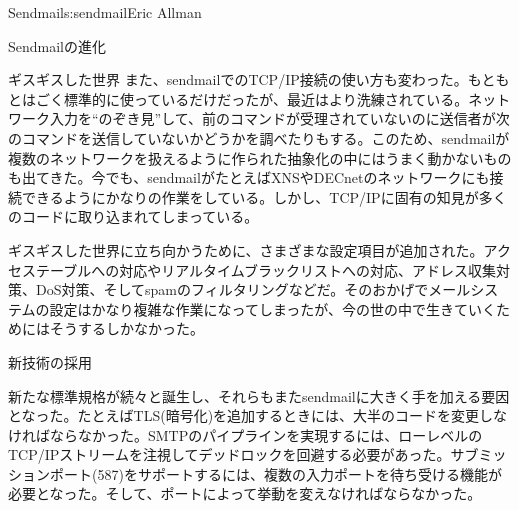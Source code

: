 \begin{aosachapter}{Sendmail}{s:sendmail}{Eric Allman}
\begin{aosasect1}{Sendmailの進化}
\begin{aosasect2}{ギスギスした世界}
また、sendmailでのTCP/IP接続の使い方も変わった。もともとはごく標準的に使っているだけだったが、最近はより洗練されている。ネットワーク入力を``のぞき見''して、前のコマンドが受理されていないのに送信者が次のコマンドを送信していないかどうかを調べたりもする。このため、sendmailが複数のネットワークを扱えるように作られた抽象化の中にはうまく動かないものも出てきた。今でも、sendmailがたとえばXNSやDECnetのネットワークにも接続できるようにかなりの作業をしている。しかし、TCP/IPに固有の知見が多くのコードに取り込まれてしまっている。

ギスギスした世界に立ち向かうために、さまざまな設定項目が追加された。アクセステーブルへの対応やリアルタイムブラックリストへの対応、アドレス収集対策、DoS対策、そしてspamのフィルタリングなどだ。そのおかげでメールシステムの設定はかなり複雑な作業になってしまったが、今の世の中で生きていくためにはそうするしかなかった。

\end{aosasect2}

\begin{aosasect2}{新技術の採用}

新たな標準規格が続々と誕生し、それらもまたsendmailに大きく手を加える要因となった。たとえばTLS(暗号化)を追加するときには、大半のコードを変更しなければならなかった。SMTPのパイプラインを実現するには、ローレベルのTCP/IPストリームを注視してデッドロックを回避する必要があった。サブミッションポート(587)をサポートするには、複数の入力ポートを待ち受ける機能が必要となった。そして、ポートによって挙動を変えなければならなかった。


\end{aosasect2}
\end{aosasect1}
\end{aosachapter}
